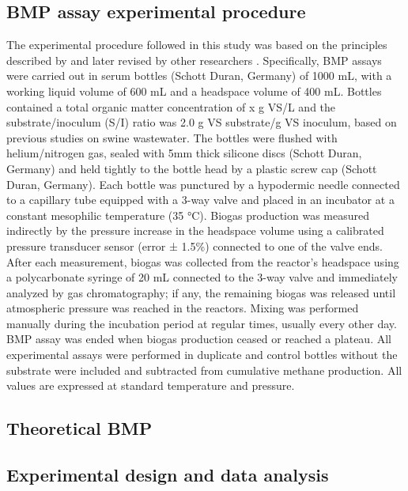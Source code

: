 \subsection{BMP assay experimental procedure}
The experimental procedure followed in this study was based on the principles described by \cite{Owen_1979} and later revised by other researchers \cite{Angelidaki_2009,Holliger_2016}. Specifically, BMP assays were carried out in serum bottles (Schott Duran, Germany) of 1000 mL, with a working liquid volume of 600 mL and a headspace volume of 400 mL. Bottles contained a total organic matter concentration of x g VS/L and the substrate/inoculum (S/I) ratio was 2.0 g VS substrate/g VS inoculum, based on previous studies on swine wastewater. The bottles were flushed with helium/nitrogen gas, sealed with 5mm thick silicone discs (Schott Duran, Germany) and held tightly to the bottle head by a plastic screw cap (Schott Duran, Germany). Each bottle was punctured by a hypodermic needle connected to a capillary tube equipped with a 3-way valve and placed in an incubator at a constant mesophilic temperature (35 °C). Biogas production was measured indirectly by the pressure increase in the headspace volume using a calibrated pressure transducer sensor (error ± 1.5\%) connected to one of the valve ends. After each measurement, biogas was collected from the reactor's headspace using a polycarbonate syringe of 20 mL connected to the 3-way valve and immediately analyzed by gas chromatography; if any, the remaining biogas was released until atmospheric pressure was reached in the reactors. Mixing was performed manually during the incubation period at regular times, usually every other day. BMP assay was ended when biogas production ceased or reached a plateau. All experimental assays were performed in duplicate and control bottles without the substrate were included and subtracted from cumulative methane production.  All values are expressed at standard temperature and pressure.
\subsection{Theoretical BMP}

\subsection{Experimental design and data analysis}


